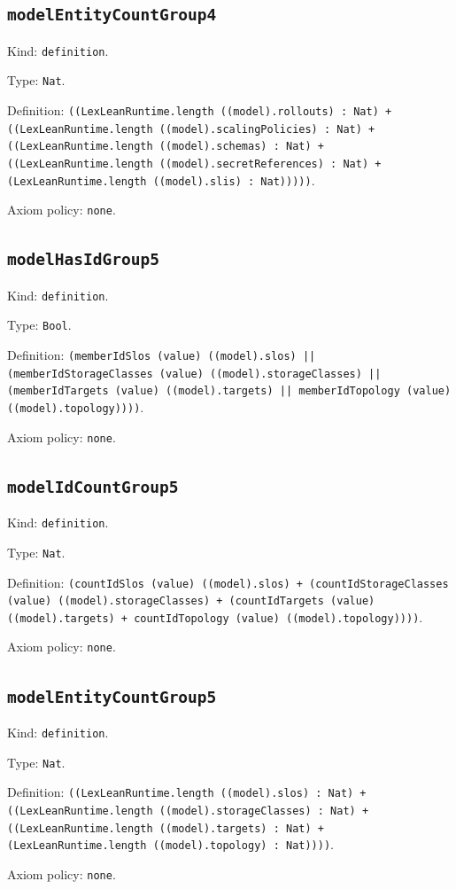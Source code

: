 \documentclass[11pt]{article}
\begin{document}
\subsection*{\texttt{modelEntityCountGroup4}}
\noindent Kind: \texttt{definition}.\par
\noindent Type: \texttt{Nat}.\par
\noindent Definition: \texttt{((LexLeanRuntime.length ((model).rollouts) : Nat) + ((LexLeanRuntime.length ((model).scalingPolicies) : Nat) + ((LexLeanRuntime.length ((model).schemas) : Nat) + ((LexLeanRuntime.length ((model).secretReferences) : Nat) + (LexLeanRuntime.length ((model).slis) : Nat)))))}.\par
\noindent Axiom policy: \texttt{none}.\par
\subsection*{\texttt{modelHasIdGroup5}}
\noindent Kind: \texttt{definition}.\par
\noindent Type: \texttt{Bool}.\par
\noindent Definition: \texttt{(memberIdSlos (value) ((model).slos) || (memberIdStorageClasses (value) ((model).storageClasses) || (memberIdTargets (value) ((model).targets) || memberIdTopology (value) ((model).topology))))}.\par
\noindent Axiom policy: \texttt{none}.\par
\subsection*{\texttt{modelIdCountGroup5}}
\noindent Kind: \texttt{definition}.\par
\noindent Type: \texttt{Nat}.\par
\noindent Definition: \texttt{(countIdSlos (value) ((model).slos) + (countIdStorageClasses (value) ((model).storageClasses) + (countIdTargets (value) ((model).targets) + countIdTopology (value) ((model).topology))))}.\par
\noindent Axiom policy: \texttt{none}.\par
\subsection*{\texttt{modelEntityCountGroup5}}
\noindent Kind: \texttt{definition}.\par
\noindent Type: \texttt{Nat}.\par
\noindent Definition: \texttt{((LexLeanRuntime.length ((model).slos) : Nat) + ((LexLeanRuntime.length ((model).storageClasses) : Nat) + ((LexLeanRuntime.length ((model).targets) : Nat) + (LexLeanRuntime.length ((model).topology) : Nat))))}.\par
\noindent Axiom policy: \texttt{none}.\par
\end{document}
